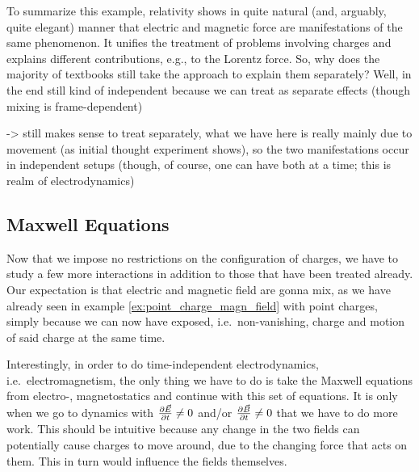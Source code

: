 \documentclass[../class_mech_main.tex]{subfiles}
\begin{document}
To summarize this example, relativity shows in quite natural (and, arguably, quite elegant) manner that electric and magnetic force are manifestations of the same phenomenon. It unifies the treatment of problems involving charges and explains different contributions, e.g., to the Lorentz force. So, why does the majority of textbooks still take the approach to explain them separately? Well, in the end still kind of independent because we can treat as separate effects (though mixing is frame-dependent)

-> still makes sense to treat separately, what we have here is really mainly due to movement (as initial thought experiment shows), so the two manifestations occur in independent setups (though, of course, one can have both at a time; this is realm of electrodynamics)










        \subsection{Maxwell Equations}
Now that we impose no restrictions on the configuration of charges, we have to study a few more interactions in addition to those that have been treated already. Our expectation is that electric and magnetic field are gonna mix, as we have already seen in example \ref{ex:point_charge_magn_field} with point charges, simply because we can now have exposed, i.e.~non-vanishing, charge and motion of said charge at the same time.

Interestingly, in order to do time-independent electrodynamics, i.e.~electromagnetism, the only thing we have to do is take the Maxwell equations from electro-, magnetostatics and continue with this set of equations. It is only when we go to dynamics with $\pdv{\vec{E}}{t} \neq 0$ and/or $\pdv{\vec{B}}{t} \neq 0$ that we have to do more work. This should be intuitive because any change in the two fields can potentially cause charges to move around, due to the changing force that acts on them. This in turn would influence the fields themselves.\\
\end{document}

